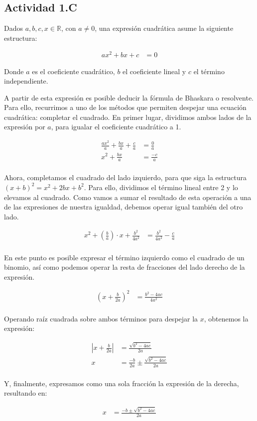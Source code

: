 \subsection*{Actividad 1.C}

Dados $a, b, c, x \in \mathbb{R}$, con $a \neq 0$, una expresión cuadrática asume la siguiente estructura:

\begin{align*}
	ax^2 + bx + c &= 0
\end{align*}

Donde $a$ es el coeficiente cuadrático, $b$ el coeficiente lineal y $c$ el término independiente.

A partir de esta expresión es posible deducir la fórmula de Bhaskara o resolvente. Para ello, recurrimos a uno de los métodos que permiten despejar una ecuación cuadrática: completar el cuadrado. En primer lugar, dividimos ambos lados de la expresión por $a$, para igualar el coeficiente cuadrático a 1.

\begin{align*}
	\frac{ax^2}{a} + \frac{bx}{a} + \frac{c}{a} &= \frac{0}{a}\\
	x^2 + \frac{bx}{a} &= \frac{-c}{a}\\
\end{align*}

Ahora, completamos el cuadrado del lado izquierdo, para que siga la estructura $(x + b)^2 = x^2 + 2bx + b^2$. Para ello, dividimos el término lineal entre 2 y lo elevamos al cuadrado. Como vamos a sumar el resultado de esta operación a una de las expresiones de nuestra igualdad, debemos operar igual también del otro lado.

\begin{align*}
	x^2 + \left(\frac{b}{a}\right) \cdot x + \frac{b^2}{4a^2} &= \frac{b^2}{4a^2} - \frac{c}{a}\\
\end{align*}

En este punto es posible expresar el término izquierdo como el cuadrado de un binomio, así como podemos operar la resta de fracciones del lado derecho de la expresión.

\begin{align*}
	(x + \frac{b}{2a})^2 &= \frac{b^2 - 4ac}{4a^2}\\
\end{align*}

Operando raíz cuadrada sobre ambos términos para despejar la $x$, obtenemos la expresión:

\begin{align*}
	|x + \frac{b}{2a}| &= \frac{\sqrt{b^2 - 4ac}}{2a}\\
	x &= \frac{-b}{2a} \pm \frac{\sqrt{b^2 - 4ac}}{2a}\\
\end{align*}

Y, finalmente, expresamos como una sola fracción la expresión de la derecha, resultando en:

\begin{align*}
	x &= \frac{-b \pm \sqrt{b^2 - 4ac}}{2a}\\
\end{align*}
